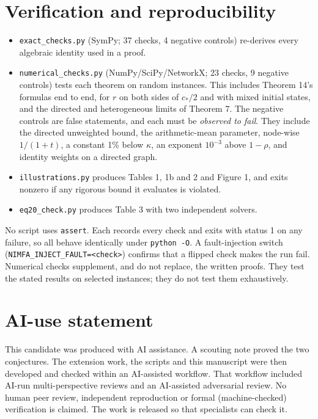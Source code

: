 \documentclass[
  11pt,
  a4paper,
]{article}
\providecommand{\tightlist}{%
  \setlength{\itemsep}{0pt}\setlength{\parskip}{0pt}}
\begin{document}
\section{Verification and
reproducibility}\label{verification-and-reproducibility}

\begin{itemize}
\tightlist
\item
  \texttt{exact\_checks.py} (SymPy; 37 checks, 4 negative controls)
  re-derives every algebraic identity used in a proof.
\item
  \texttt{numerical\_checks.py} (NumPy/SciPy/NetworkX; 23 checks, 9
  negative controls) tests each theorem on random instances. This
  includes Theorem 14's formulas end to end, for \(r\) on both sides of
  \(c_*/2\) and with mixed initial states, and the directed and
  heterogeneous limits of Theorem 7. The negative controls are false
  statements, and each must be \emph{observed to fail}. They include the
  directed unweighted bound, the arithmetic-mean parameter, node-wise
  \(1/(1+t)\), a constant 1\% below \(\kappa\), an exponent \(10^{-3}\)
  above \(1-\rho\), and identity weights on a directed graph.
\item
  \texttt{illustrations.py} produces Tables 1, 1b and 2 and Figure 1,
  and exits nonzero if any rigorous bound it evaluates is violated.
\item
  \texttt{eq20\_check.py} produces Table 3 with two independent solvers.
\end{itemize}

No script uses \texttt{assert}. Each records every check and exits with
status 1 on any failure, so all behave identically under
\texttt{python\ -O}. A fault-injection switch
(\texttt{NIMFA\_INJECT\_FAULT=\textless{}check\textgreater{}}) confirms
that a flipped check makes the run fail. Numerical checks supplement,
and do not replace, the written proofs. They test the stated results on
selected instances; they do not test them exhaustively.

\section{AI-use statement}\label{ai-use-statement}

This candidate was produced with AI assistance. A scouting note proved
the two conjectures. The extension work, the scripts and this manuscript
were then developed and checked within an AI-assisted workflow. That
workflow included AI-run multi-perspective reviews and an AI-assisted
adversarial review. No human peer review, independent reproduction or
formal (machine-checked) verification is claimed. The work is released
so that specialists can check it.
\end{document}
